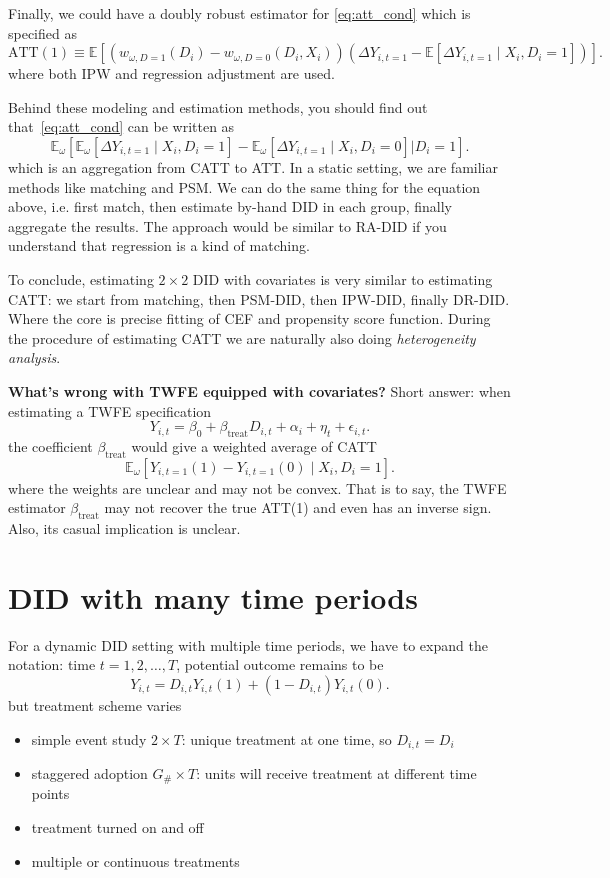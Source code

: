 \documentclass[12pt]{article}
\begin{document}
Finally, we could have a doubly robust estimator for \eqref{eq:att_cond} which is specified as
\[
  \text{ATT}(1) \equiv \mathbb{E} \left[\left(w_{\omega,D=1}(D_i)-w_{\omega, D=0}(D_i,X_i)\right)
  \left( \Delta Y_{i,t=1} - \mathbb{E}[\Delta Y_{i,t=1} \mid X_i,D_i=1] \right) \right]
.\]
where both IPW and regression adjustment are used.

Behind these modeling and estimation methods, you should find out
that~\eqref{eq:att_cond} can be written as
\[
  \mathbb{E}_{\omega }\left[ \mathbb{E}_{\omega}[ \Delta Y_{i,t=1} \mid X_i, D_i=1
  ]-\mathbb{E}_{\omega }[\Delta Y_{i,t=1} \mid X_i,D_i=0] \big| D_i=1\right]
.\]
which is an aggregation from CATT to ATT. In a static setting, we are familiar methods
like matching and PSM.
We can do the same thing for the equation above, i.e. first match, then estimate by-hand
DID in each group,
finally aggregate the results. The approach would be similar to RA-DID if you understand
that regression is
a kind of matching.

To conclude, estimating \( 2\times 2 \) DID with covariates is very similar to estimating
CATT: we start from matching, then
PSM-DID, then IPW-DID, finally DR-DID. Where the core is precise fitting of CEF and
propensity score function. During
the procedure of estimating CATT we are naturally also doing \textit{heterogeneity analysis}.

\textbf{What's wrong with TWFE equipped with covariates?} Short answer: when
estimating a TWFE specification
\[
  Y_{i,t} = \beta_{0} + \beta_{\text{treat}} D_{i,t} + \alpha_i + \eta_t + \epsilon_{i,t}
.\]
the coefficient \( \beta_{\text{treat}} \) would give a weighted average of CATT
\[
  \mathbb{E}_{\omega}[ Y_{i,t=1}(1) - Y_{i,t=1}(0) \mid X_i, D_i=1 ]
.\]
where the weights are unclear and may not be convex. That is to say, the TWFE estimator
\( \beta_{\text{treat}} \) may not recover
the true ATT(1) and even has an inverse sign. Also, its casual implication is unclear.

\section{DID with many time periods}

For a dynamic DID setting with multiple time periods, we have to expand the notation:
time \( t=1,2,\ldots ,T \),
potential outcome remains to be
\[
  Y_{i,t} = D_{i,t}Y_{i,t}(1) + ( 1 - D_{i,t} )Y_{i,t}(0)
.\]
but treatment scheme varies
\begin{itemize}
  \item simple event study \( 2 \times T \): unique treatment at one time, so \( D_{i,t}=D_{i} \)
  \item staggered adoption \( G_{\#} \times T \): units will receive treatment at
    different time points
  \item treatment turned on and off
  \item multiple or continuous treatments
\end{itemize}
\end{document}
